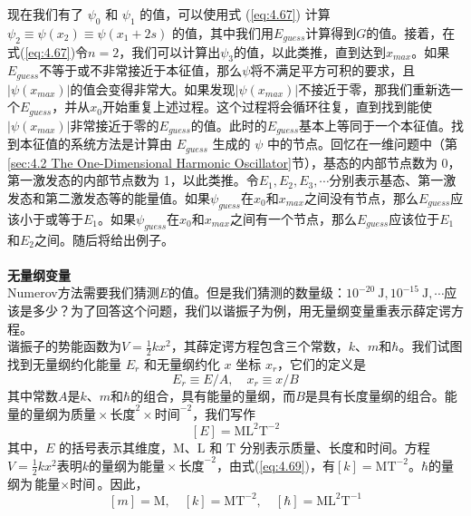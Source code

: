     \indent 现在我们有了 $\psi_0$ 和 $\psi_1$ 的值，可以使用式 (\ref{eq:4.67}) 计算 $\psi_2 \equiv \psi\left(x_2\right) \equiv \psi\left(x_1+2s\right)$ 的值，其中我们用$E_{guess}$计算得到$G$的值。接着，在式(\ref{eq:4.67})令$n=2$，我们可以计算出$\psi_3$的值，以此类推，直到达到$x_{max}$。如果$E_{guess}$不等于或不非常接近于本征值，那么$\psi$将不满足平方可积的要求，且$\left|\psi\left(x_{max}\right)\right|$的值会变得非常大。如果发现$\left|\psi\left(x_{max}\right)\right|$不接近于零，那我们重新选一个$E_{guess}$，并从$x_0$开始重复上述过程。这个过程将会循环往复，直到找到能使$\left|\psi\left(x_{max}\right)\right|$非常接近于零的$E_{guess}$的值。此时的$E_{guess}$基本上等同于一个本征值。找到本征值的系统方法是计算由 $E_{guess}$ 生成的 $\psi$ 中的节点。回忆在一维问题中（第\ref{sec:4.2 The One-Dimensional Harmonic Oscillator}节），基态的内部节点数为 0，第一激发态的内部节点数为 1，以此类推。令$E_1,E_2,E_3,\cdots$分别表示基态、第一激发态和第二激发态等的能量值。如果$\psi_{guess}$在$x_0$和$x_{max}$之间没有节点，那么$E_{guess}$应该小于或等于$E_1$。如果$\psi_{guess}$在$x_0$和$x_{max}$之间有一个节点，那么$E_{guess}$应该位于$E_1$和$E_2$之间。随后将给出例子。\\
    \\
    \noindent\textbf{无量纲变量}\\
    \indent Numerov方法需要我们猜测$E$的值。但是我们猜测的数量级：$10^{-20} \: \mathrm{J},10^{-15} \: \mathrm{J},\cdots$应该是多少？为了回答这个问题，我们以谐振子为例，用无量纲变量重表示薛定谔方程。\\
    \indent 谐振子的势能函数为$V = \frac{1}{2}kx^2$，其薛定谔方程包含三个常数，$k$、$m$和$\hbar$。我们试图找到无量纲约化能量 $E_r$ 和无量纲约化 $x$ 坐标 $x_r$，它们的定义是
    \begin{equation}
        E_r \equiv E/A, \quad x_r \equiv x/B
        \label{eq:4.68}
    \end{equation}
    其中常数$A$是$k$、$m$和$\hbar$的组合，具有能量的量纲，而$B$是具有长度量纲的组合。能量的量纲为$\text{质量}\times\text{长度}^2\times\text{时间}^{-2}$，我们写作
    \begin{equation}
        \left[E\right] = \mathrm{M}\mathrm{L}^2\mathrm{T}^{-2}
        \label{eq:4.69}
    \end{equation}
    其中，$E$ 的括号表示其维度，$\mathrm{M}$、$\mathrm{L}$ 和 $\mathrm{T}$ 分别表示质量、长度和时间。方程$V = \frac{1}{2}kx^2$表明$k$的量纲为$\text{能量}\times\text{长度}^{-2}$，由式(\ref{eq:4.69})，有$\left[k\right] = \mathrm{M}\mathrm{T}^{-2}$。$\hbar$的量纲为$\text{能量}\times\text{时间}$。因此，
    \begin{equation}
        \left[m\right] = \mathrm{M}, \quad \left[k\right] = \mathrm{M}\mathrm{T}^{-2}, \quad \left[\hbar\right] = \mathrm{M}\mathrm{L}^2\mathrm{T}^{-1}
        \label{eq:4.70}
    \end{equation}
